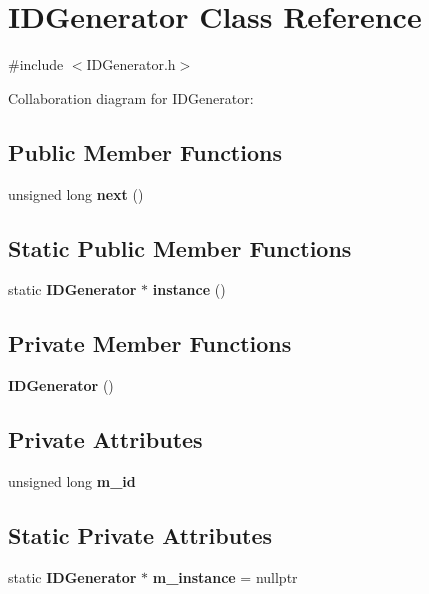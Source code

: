 \section{I\+D\+Generator Class Reference}
\label{class_i_d_generator}


{\ttfamily \#include $<$I\+D\+Generator.\+h$>$}



Collaboration diagram for I\+D\+Generator\+:
\subsection*{Public Member Functions}
\begin{DoxyCompactItemize}
\item 
unsigned long \textbf{ next} ()
\end{DoxyCompactItemize}
\subsection*{Static Public Member Functions}
\begin{DoxyCompactItemize}
\item 
static \textbf{ I\+D\+Generator} $\ast$ \textbf{ instance} ()
\end{DoxyCompactItemize}
\subsection*{Private Member Functions}
\begin{DoxyCompactItemize}
\item 
\textbf{ I\+D\+Generator} ()
\end{DoxyCompactItemize}
\subsection*{Private Attributes}
\begin{DoxyCompactItemize}
\item 
unsigned long \textbf{ m\+\_\+id}
\end{DoxyCompactItemize}
\subsection*{Static Private Attributes}
\begin{DoxyCompactItemize}
\item 
static \textbf{ I\+D\+Generator} $\ast$ \textbf{ m\+\_\+instance} = nullptr
\end{DoxyCompactItemize}


